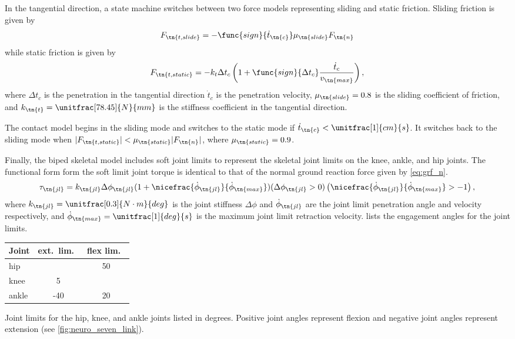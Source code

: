 In the tangential direction, a state machine switches between two force models
representing sliding and static friction. Sliding friction is given by
\begin{align}
    F_{\tn{t,slide}} = -\func{sign}{\dot t_\tn{c}} \mu_\tn{slide} F_\tn{n}
\end{align}
while static friction is given by
\begin{align}
    F_{\tn{t,static}} = -k_t \Delta t_c \left(1 + \func{sign}{\Delta t_c}
    \frac{\dot t_c}{v_\tn{max}} \right),
\end{align}
where $\Delta t_c$ is the penetration in the tangential direction $\dot t_c$ is
the penetration velocity, $\mu_\tn{slide} = 0.8$ is the sliding coefficient of
friction, and $k_\tn{t} =\unitfrac[78.45]{N}{mm}$ is the stiffness coefficient
in the tangential direction.

The contact model begins in the sliding mode and switches to the static mode if
$\dot t_\tn{c} < \unitfrac[1]{cm}{s}$. It switches back to the sliding mode when
$| F_{\tn{t,static}} | < \mu_\tn{static} | F_\tn{n} |$, where $\mu_\tn{static} =
0.9$.

Finally, the biped skeletal model includes soft joint limits to represent
the skeletal joint limits on the knee, ankle, and hip joints. The functional
form form the soft limit joint torque is identical to that of the normal ground
reaction force given by \cref{eq:grf_n}.
\begin{align}
    \tau_\tn{jl} = k_\tn{jl} \Delta \phi_\tn{jl} 
    (1 + \nicefrac{\dot \phi_\tn{jl}}{\dot \phi_\tn{max}}) 
    (\Delta \phi_\tn{jl}  > 0) 
    \left(\nicefrac{\dot \phi_\tn{jl}}{\dot \phi_\tn{max}} > -1 \right), 
    \label{eq:tau_joint_limit}
\end{align}
where $k_\tn{jl} = \unitfrac[0.3]{N \cdot m}{deg}$ is the joint stiffness $\Delta
\phi$ and $\dot \phi_\tn{jl}$ are the joint limit penetration angle and
velocity respectively, and $\dot \phi_\tn{max} = \unitfrac[1]{deg}{s}$ is the
maximum joint limit retraction velocity.  lists the
engagement angles for the joint limits.
\begin{margintable}[-0.65in]
  \centering
  \small
  \begin{tabular}{lcc}
      Joint & ext.\ lim.\ & flex lim.\ \\
      \midrule
      hip   &     & 50 \\
      knee  &   5 &    \\
      ankle & -40 & 20 \\
  \end{tabular}
  \caption{Joint limits for the hip, knee, and ankle joints listed in degrees.
  Positive joint angles represent flexion and negative joint angles represent
  extension (see \cref{fig:neuro_seven_link}).}\label{tab:joint_lim}
\end{margintable}

